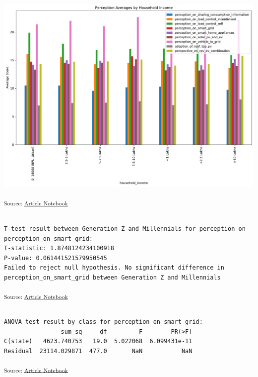 \documentclass[
  letterpaper,
  DIV=11,
  numbers=noendperiod]{scrartcl}
\begin{document}
\includegraphics{index_files/figure-pdf/cell-11-output-2.pdf}

\textsubscript{Source:
\href{https://sijuswamyresearch.github.io/SM-project/index-preview.html}{Article
Notebook}}

\begin{verbatim}

T-test result between Generation Z and Millennials for perception on perception_on_smart_grid:
T-statistic: 1.8748124234100918
P-value: 0.061441521579950545
Failed to reject null hypothesis. No significant difference in perception_on_smart_grid between Generation Z and Millennials
\end{verbatim}

\textsubscript{Source:
\href{https://sijuswamyresearch.github.io/SM-project/index-preview.html}{Article
Notebook}}

\begin{verbatim}

ANOVA test result by class for perception_on_smart_grid:
                sum_sq     df         F        PR(>F)
C(state)   4623.740753   19.0  5.022068  6.099431e-11
Residual  23114.029871  477.0       NaN           NaN
\end{verbatim}

\textsubscript{Source:
\href{https://sijuswamyresearch.github.io/SM-project/index-preview.html}{Article
Notebook}}
\end{document}
